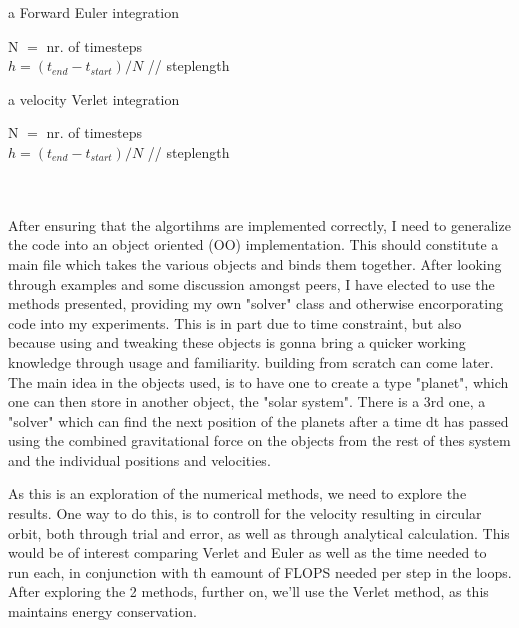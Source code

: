 \documentclass[10pt, twocolumn]{revtex4-1}
\begin{document}
\begin{algorithm}
    \caption{a Forward Euler integration}
    N $=$ nr. of timesteps \\
    $h = (t_{end} - t_{start})/N $ // steplength \\
\end{algorithm}

\begin{algorithm}
    \caption{a velocity Verlet integration}
    N $=$ nr. of timesteps \\
    $h = (t_{end} - t_{start})/N $ // steplength \\
\end{algorithm}\\\\

After ensuring that the algortihms are implemented correctly, I need to generalize the code into an object oriented (OO)
implementation. This should constitute a main file which takes the various objects and binds them together. After looking
through examples and some discussion amongst peers, I have elected to use the methods presented, providing my own "solver" class
and otherwise encorporating code into my experiments. This is in part due to time constraint, but also because using and tweaking
these objects is gonna bring a quicker working knowledge through usage and familiarity. building from scratch can come later.
The main idea in the objects used, is to have one to create a type "planet", which one can then store in another object, the 
"solar system". There is a 3rd one, a "solver" which can find the next position of the planets after a time dt has passed using
the combined gravitational force on the objects from the rest of thes system and the individual positions and velocities. 

As this is an exploration of the numerical methods, we need to explore the results. One way to do this, is to controll for the 
velocity resulting in circular orbit, both through trial and error, as well as through analytical calculation. This would be of interest
comparing Verlet and Euler as well as the time needed to run each, in conjunction with th eamount of FLOPS needed per step in the loops. 
After exploring the 2 methods, further on, we'll use the Verlet method, as this maintains energy conservation. 
\end{document}
